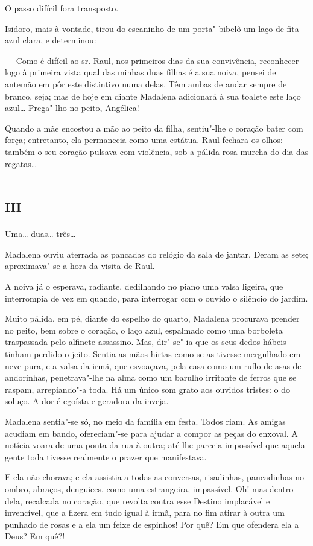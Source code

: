 O passo difícil fora transposto.

Isidoro, mais à vontade, tirou do escaninho de um porta"-bibelô um laço
de fita azul clara, e determinou:

--- Como é difícil ao sr. Raul, nos primeiros dias da sua convivência,
reconhecer logo à primeira vista qual das minhas duas filhas é a sua
noiva, pensei de antemão em pôr este distintivo numa delas. Têm ambas de
andar sempre de branco, seja; mas de hoje em diante Madalena adicionará
à sua toalete este laço azul\ldots{} Prega"-lho no peito, Angélica!

Quando a mãe encostou a mão ao peito da filha, sentiu"-lhe o coração
bater com força; entretanto, ela permanecia como uma estátua. Raul
fechara os olhos: também o seu coração pulsava com violência, sob a
pálida rosa murcha do dia das regatas\ldots{}

\section*{\textsc{iii}}

Uma\ldots{} duas\ldots{} três\ldots{}

Madalena ouviu aterrada as pancadas do relógio da sala de jantar. Deram
as sete; aproximava"-se a hora da visita de Raul.

A noiva já o esperava, radiante, dedilhando no piano uma valsa ligeira,
que interrompia de vez em quando, para interrogar com o ouvido o
silêncio do jardim.

Muito pálida, em pé, diante do espelho do quarto, Madalena procurava
prender no peito, bem sobre o coração, o laço azul, espalmado como uma
borboleta traspassada pelo alfinete assassino. Mas, dir"-se"-ia que os
seus dedos hábeis tinham perdido o jeito. Sentia as mãos hirtas como se
as tivesse mergulhado em neve pura, e a valsa da irmã, que esvoaçava,
pela casa como um ruflo de asas de andorinhas, penetrava"-lhe na alma
como um barulho irritante de ferros que se raspam, arrepiando"-a toda. Há
um único som grato aos ouvidos tristes: o do soluço. A dor é egoísta e
geradora da inveja.

Madalena sentia"-se só, no meio da família em festa. Todos riam. As
amigas acudiam em bando, ofereciam"-se para ajudar a compor as peças do
enxoval. A notícia voara de uma ponta da rua à outra; até lhe parecia
impossível que aquela gente toda tivesse realmente o prazer que
manifestava.

E ela não chorava; e ela assistia a todas as conversas, risadinhas,
pancadinhas no ombro, abraços, denguices, como uma estrangeira,
impassível. Oh! mas dentro dela, recalcada no coração, que revolta
contra esse Destino implacável e invencível, que a fizera em tudo igual
à irmã, para no fim atirar à outra um punhado de rosas e a ela um feixe
de espinhos! Por quê? Em que ofendera ela a Deus? Em quê?!

